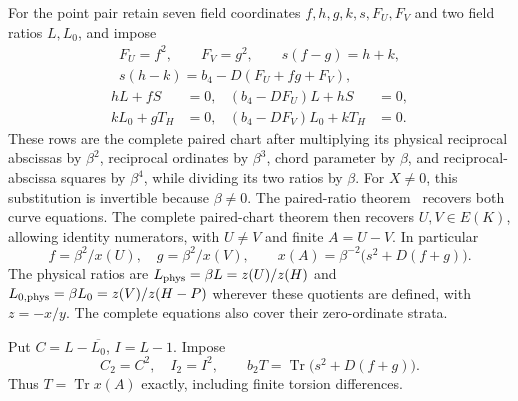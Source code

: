 \documentclass[11pt,a4paper]{article}
\DeclareMathOperator{\Tr}{Tr}\DeclareMathOperator{\Nm}{Nm}
\begin{document}
For the point pair retain seven field coordinates
$f,h,g,k,s,F_U,F_V$ and two field ratios $L,L_0$, and impose
\begin{equation}\label{eq:pair}
 \begin{gathered}
 F_U=f^2,\qquad F_V=g^2,\qquad s(f-g)=h+k,\\
 s(h-k)=b_4-D(F_U+fg+F_V),
 \end{gathered}
\end{equation}
\begin{equation}\label{eq:ratios}
 \begin{aligned}
 hL+fS&=0,&(b_4-DF_U)L+hS&=0,\\
 kL_0+gT_H&=0,&(b_4-DF_V)L_0+kT_H&=0.
 \end{aligned}
\end{equation}
These rows are the complete paired chart after multiplying its
physical reciprocal abscissas by $\beta^2$, reciprocal ordinates by
$\beta^3$, chord parameter by $\beta$, and reciprocal-abscissa squares
by $\beta^4$, while dividing its two ratios by $\beta$.
For $X\ne0$, this substitution is invertible because $\beta\ne0$.
The paired-ratio theorem~\cite[Theorem~1.1]{Pair} recovers both
curve equations. The complete paired-chart theorem
\cite[Proposition~2.1]{Trace} then recovers
$U,V\in E(K)$, allowing identity numerators, with $U\ne V$ and
finite $A=U-V$. In particular
\[
 f=\beta^2/x(U),\quad g=\beta^2/x(V),\qquad
 x(A)=\beta^{-2}\bigl(s^2+D(f+g)\bigr).
\]
The physical ratios are
$L_{\rm phys}=\beta L=z(U)/z(H)$ and
$L_{0,\rm phys}=\beta L_0=z(V)/z(H-P)$ wherever these quotients are
defined, with $z=-x/y$. The complete equations also cover their
zero-ordinate strata.

Put $C=L-\overline{L_0}$, $I=L-1$. Impose
\begin{equation}\label{eq:common}
 C_2=C^2,\quad I_2=I^2,\qquad
                    b_2T=\Tr\bigl(s^2+D(f+g)\bigr).
\end{equation}
Thus $T=\Tr x(A)$ exactly, including finite torsion differences.
\end{document}
